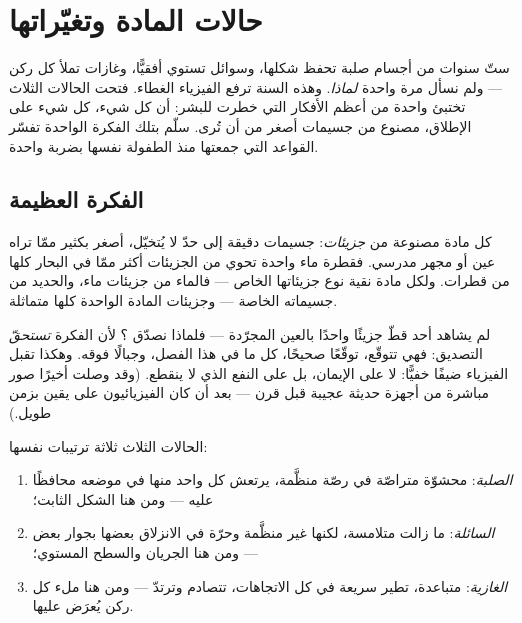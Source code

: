 \chapter{حالات المادة وتغيّراتها}\label{ch:g7:states-of-matter}

ستّ سنوات من أجسام صلبة تحفظ شكلها، وسوائل تستوي أفقيًّا، وغازات
تملأ كل ركن --- ولم نسأل مرة واحدة \emph{لماذا}. وهذه السنة ترفع
الفيزياء الغطاء. فتحت الحالات الثلاث تختبئ واحدة من أعظم الأفكار
التي خطرت للبشر: أن كل شيء، كل شيء على الإطلاق، مصنوع من جسيمات
أصغر من أن تُرى. سلّم بتلك الفكرة الواحدة تفسّر القواعد التي
جمعتها منذ الطفولة نفسها بضربة واحدة.

\section{الفكرة العظيمة}

\begin{definition}[الجزيئات]\label{def:g7:states-of-matter:molecule}
كل مادة مصنوعة من \emph{جزيئات}: جسيمات دقيقة إلى
حدّ لا يُتخيّل، أصغر بكثير ممّا تراه عين أو مجهر مدرسي. فقطرة
ماء واحدة تحوي من الجزيئات أكثر ممّا في البحار كلها من قطرات.
ولكل مادة نقية نوع جزيئاتها الخاص --- فالماء من جزيئات ماء،
والحديد من جسيماته الخاصة --- وجزيئات المادة الواحدة كلها
متماثلة.
\end{definition}

\begin{remark}\label{rem:g7:states-of-matter:believing}
لم يشاهد أحد قطّ جزيئًا واحدًا بالعين المجرّدة --- فلماذا نصدّق
؟ لأن الفكرة \emph{تستحقّ} التصديق: فهي تتوقّع، توقّعًا
صحيحًا، كل ما في هذا الفصل، وجبالًا فوقه. وهكذا تقبل الفيزياء
ضيفًا خفيًّا: لا على الإيمان، بل على النفع الذي لا ينقطع. (وقد
وصلت أخيرًا صور مباشرة من أجهزة حديثة عجيبة قبل قرن --- بعد أن
كان الفيزيائيون على يقين بزمن طويل.)
\end{remark}

\begin{proposition}\label{prop:g7:states-of-matter:model}
الحالات الثلاث ثلاثة ترتيبات  نفسها:
\begin{enumerate}
  \item \emph{الصلبة}:  محشوّة متراصّة في رصّة منظَّمة،
        يرتعش كل واحد منها في موضعه محافظًا عليه --- ومن هنا
        الشكل الثابت؛
  \item \emph{السائلة}:  ما زالت متلامسة، لكنها غير
        منظَّمة وحرّة في الانزلاق بعضها بجوار بعض --- ومن هنا
        الجريان والسطح المستوي؛
  \item \emph{الغازية}:  متباعدة، تطير سريعة في كل
        الاتجاهات، تتصادم وترتدّ --- ومن هنا ملء كل ركن
        يُعرَض عليها.
\end{enumerate}
\end{proposition}

